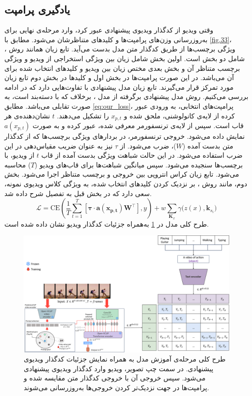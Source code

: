 \subsection{یادگیری پرامپت}
وقتی ویدیو از کدگذار ویدیوی پیشنهادی عبور کرد، وارد مرحله‌ی نهایی برای به‌روزرسانی وزن‌های پرامپت‌ها و کلید‌های متناظرشان می‌شود. مطابق با \cref{fig.33}، ویژگی برچسب‌ها از طریق کدگذار متن مدل  بدست می‌آید. تابع زیان همانند روش ، شامل دو بخش است. اولین بخش شامل زیان بین ویژگی استخراجی از ویدیو و ویژگی برچسب متناظر آن و بخش بعدی مختص زیان بین ویدیو و کلیدهای انتخاب شده برای آن می‌باشد. در این صورت پرامپت‌ها در بخش اول و کلیدها در بخش دوم تابع زیان مورد تمرکز قرار می‌گیرند. تابع زیان مدل پیشنهادی با  تفاوت‌هایی دارد که در ادامه بررسی می‌کنیم. روش مدل پیشنهادی برگرفته از مدل ، برخلاف  که با دسته‌بند است، به صورت تقابلی می‌باشد. مطابق \eqref{eq:our_loss}، پرامپت‌های انتخابی، به ورودی عبور کرده از لایه‌ی کانولوشنی، ملحق شده و $x_{p,t}$ را تشکیل می‌دهند. $t$ نشان‌دهنده‌ی هر قاب است. سپس از لایه‌ی ترنسفورمر معرفی شده، عبور کرده و به صورت $a(x_{p,t})$ نمایش داده می‌شود. خروجی ترنسفورمر، در بردارهای ویژگی برچسب‌ها که از کدگذار متن بدست آمده ($W$)، ضرب می‌شود. از $\tau$ نیز به عنوان ضریب مقیاس‌دهی در این ضرب استفاده می‌شود. در این حالت شباهت ویژگی بدست آمده از قاب $t$ از ویدیو، با برچسب‌ها سنجیده می‌شود. سپس میانگین شباهت‌ها برای قاب‌های ویدیو ($T$) محاسبه می‌شود. تابع زیان کراس انتروپی بین خروجی و برچسب‌ متناظر اجرا می‌شود. بخش دوم، مانند روش ، بر نزدیک کردن کلیدهای انتخاب شده، به ویژگی کلاس ویدیوی نمونه، سعی دارد که در بخش قبل به تفصیل شرح داده شد.
\begin{equation}\label{eq:our_loss}
	\mathcal{L} = \mathrm{CE} \left( 
	\frac{1}{T} \sum_{t=1}^{T} 
	\left[ 
	\mathbf{\tau \cdot a(x_{p,t})} \mathbf{W}^{\top} 
	\right], 
	y 
	\right) 
	+ w \sum_{\mathbf{K}_x} \gamma \big( z(x), \mathbf{k}_{s_i} \big)
\end{equation}
طرح کلی مدل در \ref{fig.34_wolemodel} به‌همراه جزئیات کدگذار ویدیو نشان داده شده است. 
\begin{figure}
	\centering\includegraphics[scale=.35]{Images/Chapter3/whole model.png}
	\caption[طرح کلی مرحله‌‌ی آموزش  مدل  به‌صورت جزئی‌تر.]{طرح کلی مرحله‌‌ی آموزش  مدل  به همراه نمایش جزئیات کدگذار ویدیوی پیشنهادی.
		در سمت چپ تصویر، ویدیو وارد کدگذار ویدیوی پیشنهادی می‌شود. سپس خروجی آن با خروجی کدگذار متن مقایسه شده و پرامپت‌ها در جهت نزدیک‌تر کردن خروجی‌ها به‌روزرسانی می‌شوند. 
	}
	\label{fig.34_wolemodel}
\end{figure}
